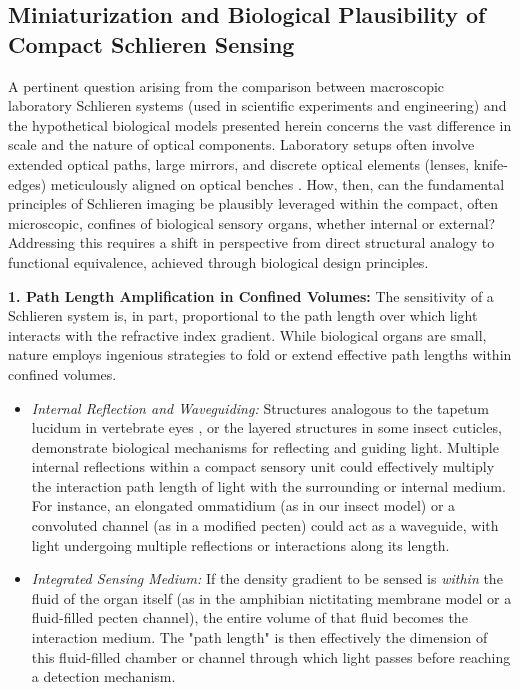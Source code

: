 \documentclass[11pt]{article}
\begin{document}
\subsection{Miniaturization and Biological Plausibility of Compact Schlieren Sensing}
\label{sec:miniaturization} %



A pertinent question arising from the comparison between macroscopic laboratory Schlieren systems (used in scientific experiments and engineering) and the hypothetical biological models presented herein concerns the vast difference in scale and the nature of optical components. Laboratory setups often involve extended optical paths, large mirrors, and discrete optical elements (lenses, knife-edges) meticulously aligned on optical benches \cite{Settles2001Schlieren}. How, then, can the fundamental principles of Schlieren imaging be plausibly leveraged within the compact, often microscopic, confines of biological sensory organs, whether internal or external? Addressing this requires a shift in perspective from direct structural analogy to functional equivalence, achieved through biological design principles.

\textbf{1. Path Length Amplification in Confined Volumes:}
The sensitivity of a Schlieren system is, in part, proportional to the path length over which light interacts with the refractive index gradient. While biological organs are small, nature employs ingenious strategies to fold or extend effective path lengths within confined volumes.
    \begin{itemize}
        \item \textit{Internal Reflection and Waveguiding:} Structures analogous to the tapetum lucidum in vertebrate eyes \cite{Walls1942VertebrateEye}, or the layered structures in some insect cuticles, demonstrate biological mechanisms for reflecting and guiding light. Multiple internal reflections within a compact sensory unit could effectively multiply the interaction path length of light with the surrounding or internal medium. For instance, an elongated ommatidium (as in our insect model) or a convoluted channel (as in a modified pecten) could act as a waveguide, with light undergoing multiple reflections or interactions along its length.
        \item \textit{Integrated Sensing Medium:} If the density gradient to be sensed is \textit{within} the fluid of the organ itself (as in the amphibian nictitating membrane model or a fluid-filled pecten channel), the entire volume of that fluid becomes the interaction medium. The "path length" is then effectively the dimension of this fluid-filled chamber or channel through which light passes before reaching a detection mechanism.
    \end{itemize}
\end{document}
